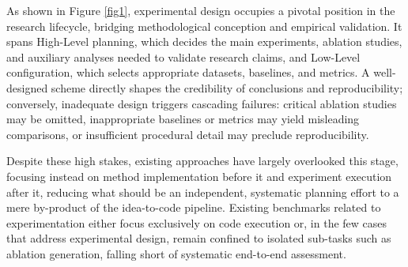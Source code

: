 \documentclass[letterpaper]{article} %
\begin{document}
As shown in Figure \ref{fig1}, experimental design occupies a pivotal position in the research lifecycle, bridging methodological conception and empirical validation. It spans High-Level planning, which decides the main experiments, ablation studies, and auxiliary analyses needed to validate research claims, and Low-Level configuration, which selects appropriate datasets, baselines, and metrics. A well-designed scheme directly shapes the credibility of conclusions and reproducibility; conversely, inadequate design triggers cascading failures: critical ablation studies may be omitted, inappropriate baselines or metrics may yield misleading comparisons, or insufficient procedural detail may preclude reproducibility.

Despite these high stakes, existing approaches have largely overlooked this stage, focusing instead on method 
implementation before it and experiment execution after it, reducing what should be an independent, systematic planning 
effort to a mere by-product of the idea-to-code pipeline. Existing benchmarks \cite{kon2025exp,abramovich2025ablationbench,zhao2025abgen} related to experimentation either focus exclusively on code
execution or, in the few cases that address experimental design,
remain confined to isolated sub-tasks such as ablation generation,
falling short of systematic end-to-end assessment.
\end{document}
